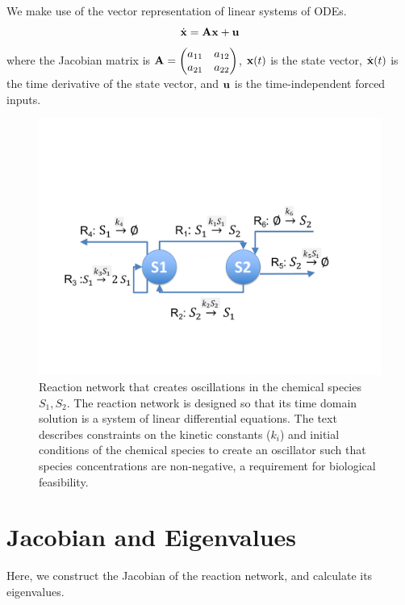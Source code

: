 \documentclass{bmcart}
\begin{document}
We make use of the vector representation of linear systems of ODEs.
\begin{equation*}
\dot{\bf x} = {\bf A} {\bf x} + {\bf u}
\end{equation*} where the Jacobian matrix is
${\bf A} = \begin{pmatrix} a_{11} & a_{12} \\ a_{21} & a_{22} \\ \end{pmatrix}$,
${\bf x} (t)$ is the state vector,
$\dot {\bf x} (t)$ is the time derivative of the state vector, and ${\bf u}$ is the time-independent forced inputs.

\begin{figure}
        \centering
         \includegraphics[scale=0.5]{Fig1.pdf}
         \caption[]{Reaction network that creates oscillations in the chemical species $S_1, S_2$. The reaction network is designed so that its time domain solution is a system of linear differential equations. The text describes constraints on the kinetic constants ($k_i$) and initial conditions of the chemical species to create an oscillator such that species concentrations are non-negative, a requirement for biological feasibility.}
         \label{fig:reaction-network}
\end{figure}

\section{Jacobian and Eigenvalues}
Here, we construct the Jacobian of the reaction network, and calculate its eigenvalues.
\end{document}
